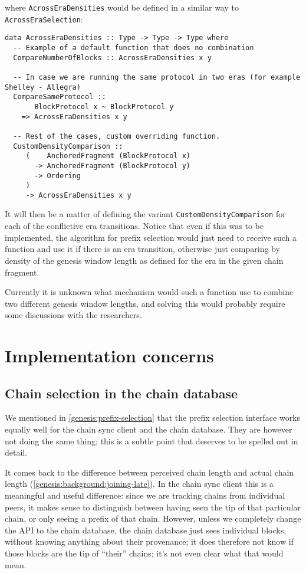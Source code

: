 where \lstinline!AcrossEraDensities! would be defined in a similar way to
\lstinline!AcrossEraSelection!:

\begin{lstlisting}
data AcrossEraDensities :: Type -> Type -> Type where
  -- Example of a default function that does no combination
  CompareNumberOfBlocks :: AcrossEraDensities x y

  -- In case we are running the same protocol in two eras (for example Shelley - Allegra)
  CompareSameProtocol ::
       BlockProtocol x ~ BlockProtocol y
    => AcrossEraDensities x y

  -- Rest of the cases, custom overriding function.
  CustomDensityComparison ::
     (    AnchoredFragment (BlockProtocol x)
       -> AnchoredFragment (BlockProtocol y)
       -> Ordering
     )
     -> AcrossEraDensities x y
\end{lstlisting}

It will then be a matter of defining the variant
\lstinline!CustomDensityComparison! for each of the conflictive era
transitions. Notice that even if this was to be implemented, the algorithm for
prefix selection would just need to receive such a function and use it if there
is an era transition, otherwise just comparing by density of the genesis window
length as defined for the era in the given chain fragment.

Currently it is unknown what mechanism would such a function use to combine two
different genesis window lengths, and solving this would probably require some
discussions with the researchers.

\section{Implementation concerns}

\subsection{Chain selection in the chain database}
\label{genesis:chain-database}

We mentioned in \cref{genesis:prefix-selection} that the prefix selection
interface works equally well for the chain sync client and the chain database.
They are however not doing the same thing; this is a subtle point that deserves
to be spelled out in detail.

It comes back to the difference between perceived chain length and actual chain
length (\cref{genesis:background:joining-late}). In the chain sync client this
is a meaningful and useful difference: since we are tracking chains from
individual peers, it makes sense to distinguish between having seen the tip of
that particular chain, or only seeing a prefix of that chain. However, unless we
completely change the API to the chain database, the chain database just sees
individual blocks, without knowing anything about their provenance;  it  does
therefore not know if those blocks are the tip of ``their'' chains; it's not
even clear what that would mean.

